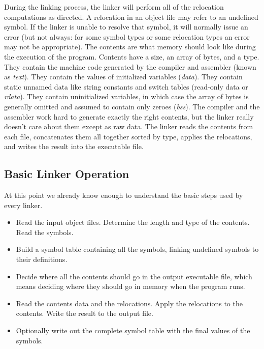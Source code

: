 During the linking process, the linker will perform all of the
relocation computations as directed. A relocation in an object file
may refer to an undefined symbol. If the linker is unable to resolve
that symbol, it will normally issue an error (but not always: for some
symbol types or some relocation types an error may not be appropriate).
The contents are what memory should look like during the execution
of the program. Contents have a size, an array of bytes, and a type.
They contain the machine code generated by the compiler and assembler
(known as \emph{text}). They contain the values of initialized variables
(\emph{data}). They contain static unnamed data like string constants
and switch tables (read-only data or \emph{rdata}). They contain
uninitialized variables, in which case the array of bytes is generally
omitted and assumed to contain only zeroes (\emph{bss}). The compiler
and the assembler work hard to generate exactly the right contents,
but the linker really doesn't care about them except as raw data. The
linker reads the contents from each file, concatenates them all together
sorted by type, applies the relocations, and writes the result into the
executable file.

\subsection{Basic Linker Operation}

At this point we already know enough to understand the basic steps used by
every linker.

\begin{itemize}
    \item Read the input object files. Determine the length and type of
          the contents. Read the symbols.

    \item Build a symbol table containing all the symbols, linking
          undefined symbols to their definitions.

    \item Decide where all the contents should go in the output
          executable file, which means deciding where they should go in
          memory when the program runs.

    \item Read the contents data and the relocations. Apply the
          relocations to the contents. Write the result to the output
          file.

    \item Optionally write out the complete symbol table with the final
          values of the symbols.
\end{itemize}
